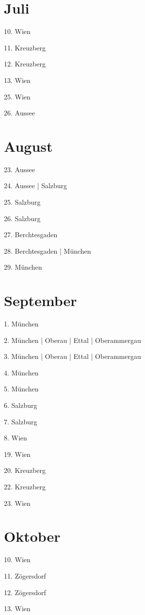\documentclass[twoside=false,titlepage=false,open=any, parskip=never, fontsize=10pt, headings=small, chapterprefix=false, appendixprefix=false, DIV=15]{scrbook}
\begin{document}
\begin{multicols}{3}
            \section*{Juli}
            10. Wien\par
            11. Kreuzberg\par
            12. Kreuzberg\par
            13. Wien\par
            25. Wien\par
            26. Aussee\par
            \section*{August}
            23. Aussee\par
            24. Aussee | Salzburg\par
            25. Salzburg\par
            26. Salzburg\par
            27. Berchtesgaden\par
            28. Berchtesgaden | München\par
            29. München\par
            \section*{September}
            1. München\par
            2. München | Oberau | Ettal | Oberammergau\par
            3. München | Oberau | Ettal | Oberammergau\par
            4. München\par
            5. München\par
            6. Salzburg\par
            7. Salzburg\par
            8. Wien\par
            19. Wien\par
            20. Kreuzberg\par
            22. Kreuzberg\par
            23. Wien\par
            \section*{Oktober}
            10. Wien\par
            11. Zögersdorf\par
            12. Zögersdorf\par
            13. Wien\par

\end{multicols}
\end{document}

